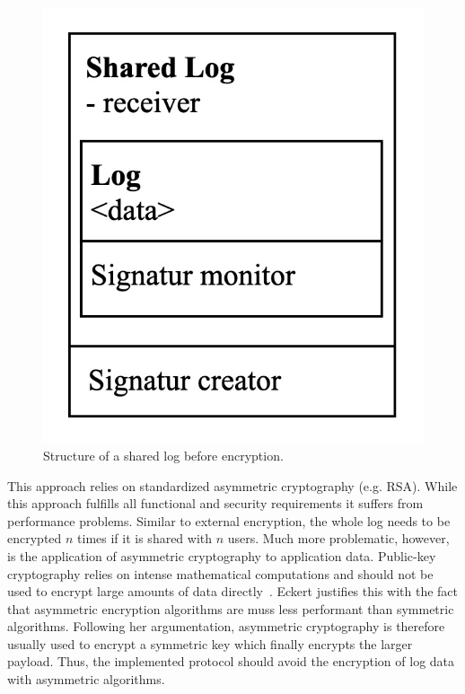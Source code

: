 \documentclass[../main.tex]{subfiles}
\begin{document}
\begin{figure}[ht]
    \includegraphics[scale=0.2]{../img/04/mutual_encryption.jpg}
    \centering
    \caption{Structure of a shared log before encryption.}
    \label{fig:mutual_encryption}
\end{figure}

This approach relies on standardized asymmetric cryptography (e.g. RSA).
While this approach fulfills all functional and security requirements it suffers from performance problems.
Similar to external encryption, the whole log needs to be encrypted $n$ times if it is shared with $n$ users.
Much more problematic, however, is the application of asymmetric cryptography to application data.
Public-key cryptography relies on intense mathematical computations and should not be used to encrypt large amounts of data directly~\cite[340]{Eckert2018}.
Eckert justifies this with the fact that asymmetric encryption algorithms are muss less performant than symmetric algorithms.
Following her argumentation, asymmetric cryptography is therefore usually used to encrypt a symmetric key which finally encrypts the larger payload.
Thus, the implemented protocol should avoid the encryption of log data with asymmetric algorithms.
\end{document}

